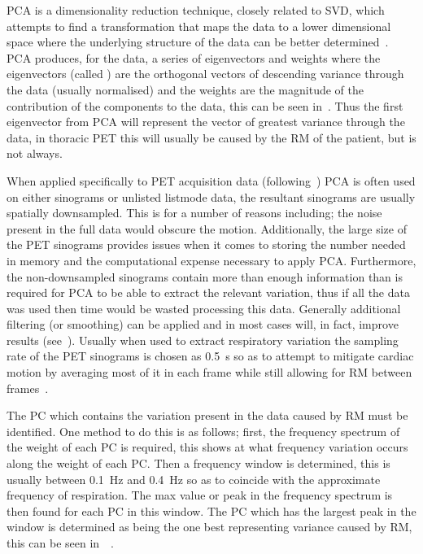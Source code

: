                 \gls{PCA} is a dimensionality reduction technique, closely related to \gls{SVD}, which attempts to find a transformation that maps the data to a lower dimensional space where the underlying structure of the data can be better determined~\parencite{Pearson1901OnSpace}. \gls{PCA} produces, for the data, a series of eigenvectors and weights where the eigenvectors (called ) are the orthogonal vectors of descending variance through the data (usually normalised) and the weights are the magnitude of the contribution of the components to the data, this can be seen in~. Thus the first eigenvector from \gls{PCA} will represent the vector of greatest variance through the data, in thoracic \gls{PET} this will usually be caused by the \gls{RM} of the patient, but is not always.
                
                When applied specifically to \gls{PET} acquisition data (following~\parencite{Thielemans2011}) \gls{PCA} is often used on either sinograms or unlisted listmode data, the resultant sinograms are usually spatially downsampled. This is for a number of reasons including; the noise present in the full data would obscure the motion. Additionally, the large size of the \gls{PET} sinograms provides issues when it comes to storing the number needed in memory and the computational expense necessary to apply \gls{PCA}. Furthermore, the non-downsampled sinograms contain more than enough information than is required for \gls{PCA} to be able to extract the relevant variation, thus if all the data was used then time would be wasted processing this data. Generally additional filtering (or smoothing) can be applied and in most cases will, in fact, improve results (see~). Usually when used to extract respiratory variation the sampling rate of the \gls{PET} sinograms is chosen as \SI{0.5}{\second} so as to attempt to mitigate cardiac motion by averaging most of it in each frame while still allowing for \gls{RM} between frames~\parencite{Bertolli2018Data-DrivenTomography}.
                
                The \gls{PC} which contains the variation present in the data caused by \gls{RM} must be identified. One method to do this is as follows; first, the frequency spectrum of the weight of each \gls{PC} is required, this shows at what frequency variation occurs along the weight of each \gls{PC}. Then a frequency window is determined, this is usually between \SI{0.1}{\hertz} and \SI{0.4}{\hertz} so as to coincide with the approximate frequency of respiration. The max value or peak in the frequency spectrum is then found for each \gls{PC} in this window. The \gls{PC} which has the largest peak in the window is determined as being the one best representing variance caused by \gls{RM}, this can be seen in~~\parencite{Thielemans2011}.
                
